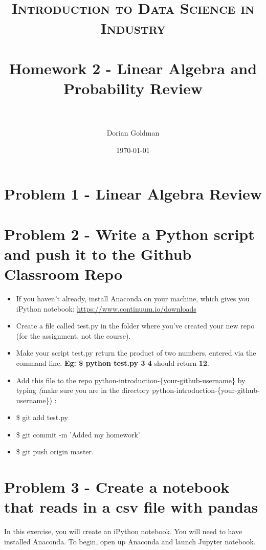 \documentclass[paper=a4, fontsize=11pt]{scrartcl} %
\title{	
\normalfont \normalsize 
\textsc{Introduction to Data Science in Industry} \\ [25pt] %
\horrule{0.5pt} \\[0.4cm] %
\huge Homework 2 - Linear Algebra and Probability Review\\ %
\horrule{2pt} \\[0.5cm] %
}
\author{Dorian Goldman} %
\date{\normalsize\today} %
\numberwithin{equation}{section} %
\numberwithin{figure}{section} %
\numberwithin{table}{section} %
\begin{document}
\maketitle %


\section{Problem 1 - Linear Algebra Review}






\section{Problem 2 - Write a Python script and push it to the Github Classroom Repo}

\begin{itemize}
\item If you haven't already, install Anaconda on your machine, which gives you iPython notebook: \url{https://www.continuum.io/downloads}
\item Create a file called test.py in the folder where you've created your new repo (for the assignment, not the course).
\item Make your script test.py return the product of two numbers, entered via the command line. \textbf{Eg: \$ python test.py 3 4 } should return \textbf{12}. 
\item Add this file to the repo python-introduction-\{your-github-username\} by typing \emph(make sure you are in the directory python-introduction-\{your-github-username\}) :
\item \$ git add test.py
\item \$ git commit -m 'Added my homework'
\item \$ git push origin master.
\end{itemize}

\section{Problem 3 - Create a notebook that reads in a csv file with pandas}

In this exercise, you will create an iPython notebook. You will need to have installed Anaconda. To begin, open up Anaconda and launch Jupyter notebook.
\end{document}
